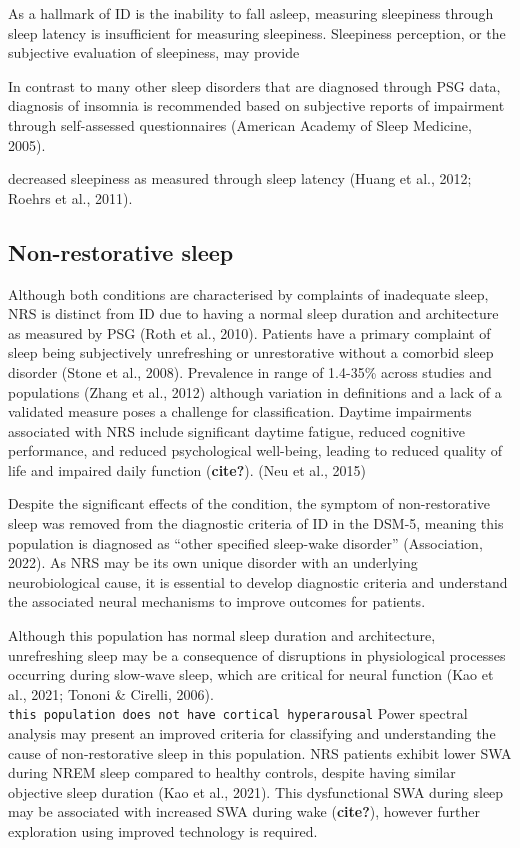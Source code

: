 \documentclass[
]{article}
\begin{document}
As a hallmark of ID is the inability to fall asleep, measuring
sleepiness through sleep latency is insufficient for measuring
sleepiness. Sleepiness perception, or the subjective evaluation of
sleepiness, may provide

In contrast to many other sleep disorders that are diagnosed through PSG
data, diagnosis of insomnia is recommended based on subjective reports
of impairment through self-assessed questionnaires (American Academy of
Sleep Medicine, 2005).

decreased sleepiness as measured through sleep latency (Huang et al.,
2012; Roehrs et al., 2011).

\subsection{Non-restorative sleep}\label{non-restorative-sleep}

Although both conditions are characterised by complaints of inadequate
sleep, NRS is distinct from ID due to having a normal sleep duration and
architecture as measured by PSG (Roth et al., 2010). Patients have a
primary complaint of sleep being subjectively unrefreshing or
unrestorative without a comorbid sleep disorder (Stone et al., 2008).
Prevalence in range of 1.4-35\% across studies and populations (Zhang et
al., 2012) although variation in definitions and a lack of a validated
measure poses a challenge for classification. Daytime impairments
associated with NRS include significant daytime fatigue, reduced
cognitive performance, and reduced psychological well-being, leading to
reduced quality of life and impaired daily function (\textbf{cite?}).
(Neu et al., 2015)

Despite the significant effects of the condition, the symptom of
non-restorative sleep was removed from the diagnostic criteria of ID in
the DSM-5, meaning this population is diagnosed as ``other specified
sleep-wake disorder'' (Association, 2022). As NRS may be its own unique
disorder with an underlying neurobiological cause, it is essential to
develop diagnostic criteria and understand the associated neural
mechanisms to improve outcomes for patients.

Although this population has normal sleep duration and architecture,
unrefreshing sleep may be a consequence of disruptions in physiological
processes occurring during slow-wave sleep, which are critical for
neural function (Kao et al., 2021; Tononi \& Cirelli, 2006).
\texttt{this\ population\ does\ not\ have\ cortical\ hyperarousal} Power
spectral analysis may present an improved criteria for classifying and
understanding the cause of non-restorative sleep in this population. NRS
patients exhibit lower SWA during NREM sleep compared to healthy
controls, despite having similar objective sleep duration (Kao et al.,
2021). This dysfunctional SWA during sleep may be associated with
increased SWA during wake (\textbf{cite?}), however further exploration
using improved technology is required.
\end{document}
